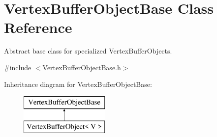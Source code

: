 \hypertarget{class_vertex_buffer_object_base}{}\section{Vertex\+Buffer\+Object\+Base Class Reference}
\label{class_vertex_buffer_object_base}


Abstract base class for specialized Vertex\+Buffer\+Objects.  




{\ttfamily \#include $<$Vertex\+Buffer\+Object\+Base.\+h$>$}

Inheritance diagram for Vertex\+Buffer\+Object\+Base\+:\begin{figure}[H]
\begin{center}
\leavevmode
\includegraphics[height=2.000000cm]{class_vertex_buffer_object_base}
\end{center}
\end{figure}
